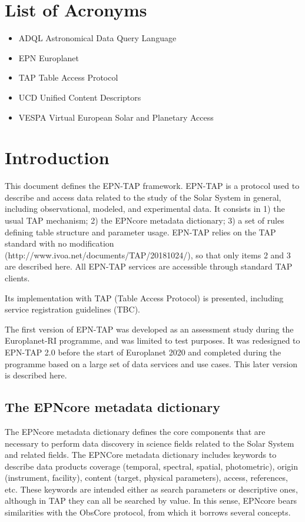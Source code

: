 \documentclass[11pt,a4paper]{ivoa}
\begin{document}
\section*{List of Acronyms}
\begin{itemize}
\item{ADQL} Astronomical Data Query Language
\item{EPN} Europlanet
\item{TAP} Table Access Protocol 
\item{UCD} Unified Content Descriptors
\item{VESPA} Virtual European Solar and Planetary Access
\end{itemize}

\section{Introduction}


This document defines the EPN-TAP framework. EPN-TAP is a protocol used to describe and access data related to the study of the Solar System in general, including observational, modeled, and experimental data. It consists in 1) the usual TAP mechanism; 2) the EPNcore metadata dictionary; 3) a set of rules defining table structure and parameter usage. EPN-TAP relies on the TAP standard with no modification (http://www.ivoa.net/documents/TAP/20181024/), so that only items 2 and 3 are described here. All EPN-TAP services are accessible through standard TAP clients. 

Its implementation with TAP (Table Access Protocol) is presented, including service registration guidelines (TBC). 

The first version of EPN-TAP was developed as an assessment study during the Europlanet-RI programme, and was limited to test purposes. It was redesigned to EPN-TAP 2.0 before the start of Europlanet 2020 and completed during the programme based on a large set of data services and use cases. This later version is described here.


\subsection{The EPNcore metadata dictionary}

The EPNcore metadata dictionary defines the core components that are necessary to perform data discovery in science fields related to the Solar System and related fields. The EPNCore metadata dictionary includes keywords to describe data products coverage (temporal, spectral, spatial, photometric), origin (instrument, facility), content (target, physical parameters), access, references, etc. These keywords are intended either as search parameters or descriptive ones, although in TAP they can all be searched by value. In this sense, EPNcore bears similarities with the ObsCore protocol, from which it borrows several concepts. 
\end{document}
